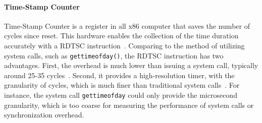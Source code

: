 \paragraph{Time-Stamp Counter}
Time-Stamp Counter is a register in all x86 computer that saves the number of cycles since reset. This hardware enables the collection of the time duration accurately with a RDTSC instruction~\cite{coorporation1997using, weaver2013linux}. Comparing to the method of utilizing system calls, such as \texttt{gettimeofday()}, the RDTSC instruction has two advantages. First, the overhead is much lower than issuing a system call, typically around 25-35 cycles~\cite{rdtscoverhead}. Second, it provides a high-resolution timer, with the granularity of cycles, which is much finer than traditional system calls~\cite{pitfallsrdtsc}. For instance, the system call \texttt{gettimeofday} could only provide the microsecond granularity, which is too coarse for measuring the performance of system calls or synchronization overhead.  





